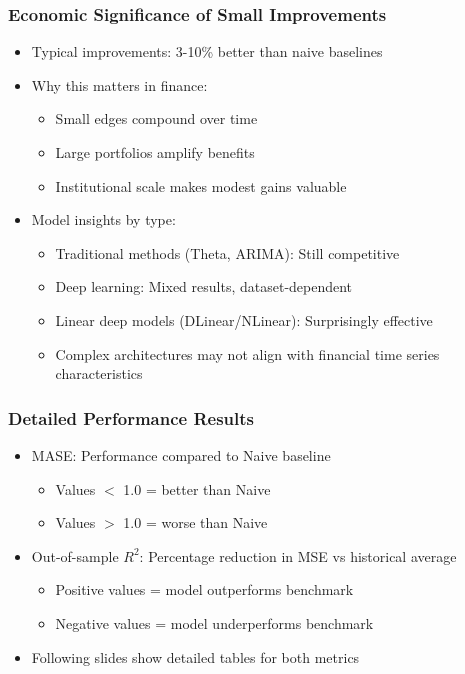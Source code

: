 \documentclass[ignorenonframetext, 9pt]{beamer}
\begin{document}
\begin{frame}
  \frametitle{Economic Significance of Small Improvements}
  \begin{itemize}
  \item Typical improvements: \alert{3-10\% better than naive baselines}
  \vspace{0.3cm}
  \item Why this matters in finance:
  \begin{itemize}
    \item Small edges compound over time
    \item Large portfolios amplify benefits
    \item Institutional scale makes modest gains valuable
  \end{itemize}
  \vspace{0.3cm}
  \item \alert{Model insights by type:}
  \begin{itemize}
    \item Traditional methods (Theta, ARIMA): Still competitive
    \item Deep learning: Mixed results, dataset-dependent
    \item Linear deep models (DLinear/NLinear): Surprisingly effective
    \item Complex architectures may not align with financial time series characteristics
  \end{itemize}
  \end{itemize}
\end{frame}

\begin{frame}
  \frametitle{Detailed Performance Results}
  \begin{itemize}
  \item MASE: Performance compared to Naive baseline
  \begin{itemize}
    \item Values $<$ 1.0 = better than Naive
    \item Values $>$ 1.0 = worse than Naive
  \end{itemize}
  \item Out-of-sample $R^2$: Percentage reduction in MSE vs historical average
  \begin{itemize}
    \item Positive values = model outperforms benchmark
    \item Negative values = model underperforms benchmark
  \end{itemize}
  \item Following slides show detailed tables for both metrics
  \end{itemize}
\end{frame}
\end{document}

